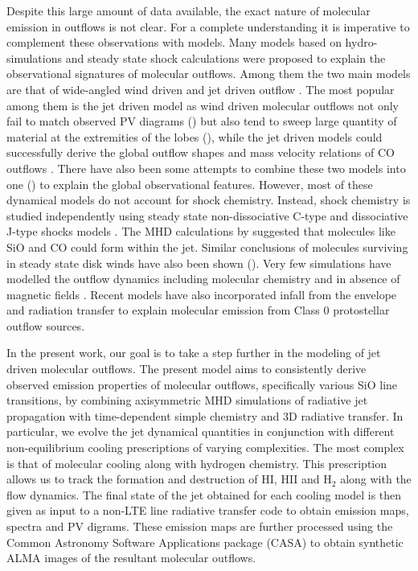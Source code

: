 \documentclass[useAMS,usenatbib]{mn2e}
\begin{document}
Despite this large amount of data available, the exact nature of
molecular emission in outflows is not clear. For a complete understanding it is imperative
to complement these observations with models. Many models
based on hydro-simulations and steady state shock calculations
were proposed to explain the observational signatures of molecular
outflows. Among them the two main models are that of wide-angled wind
driven \citep{Shu:1991p14071} and jet driven outflow
\citep{Canto:1991p14123}. 
The most popular among them is the jet driven model as wind
driven molecular outflows not only fail to match observed PV diagrams (\citealt{Cabrit:1992p14098})
but also tend to sweep large quantity of material at the extremities
of the lobes (\citealt{Masson:1992p14101}), while the jet driven models could successfully
derive the global outflow shapes and mass velocity relations of CO
outflows \citep{Raga:1993p9948,
  Masson:1993p9661,Downes:2003p9946,Downes:2007p9514}. 
There have also been some attempts to combine these two
models into one (\citealt{Shang:2006p14268}) to explain the global observational features. 
However, most of these dynamical models do not
account for shock chemistry. Instead, shock chemistry is studied
independently using steady state non-dissociative C-type and
dissociative J-type shocks models \citep{Neufeld:1989p11689, Schilke:1997p14140,Flower:2003p11236}. 
The MHD calculations by \cite{Glassgold:1991p13703} suggested that molecules
like SiO and CO could form within the jet. Similar conclusions of
molecules surviving in steady state disk winds have also been shown
(\citealt{Panoglou:2012p10039}). 
Very few simulations have modelled the outflow
dynamics including molecular chemistry and in absence of
magnetic fields \citep{Raga:1995p12965, Smith:2003p9985}. 
Recent models have also incorporated
infall from the envelope \citep{Rawlings:2013p14920} and radiation
transfer \citep{Offner:2011p14861, Offner:2013p16717} to explain molecular 
emission from Class 0 protostellar outflow sources. 



%
In the present work, our goal is to take a step further in the modeling of
jet driven molecular outflows. The present model aims to consistently derive observed emission properties of molecular outflows, specifically various SiO line
transitions, by combining axisymmetric MHD simulations of
radiative jet propagation with time-dependent simple chemistry and 3D radiative
transfer. In particular, we evolve the jet dynamical
quantities in conjunction with different non-equilibrium cooling
prescriptions of varying complexities. The most complex is that of
molecular cooling along with hydrogen chemistry. This prescription
allows us to track the formation and destruction of 
HI, HII and H$_{2}$ along with the flow dynamics. 
The final state of the jet obtained for each cooling model is then
given as input to a non-LTE line radiative transfer code
to obtain emission maps, spectra and PV digrams. These emission maps
are further processed using the Common Astronomy Software Applications
package (CASA) to obtain synthetic ALMA images of the resultant molecular outflows.
%
\end{document}
